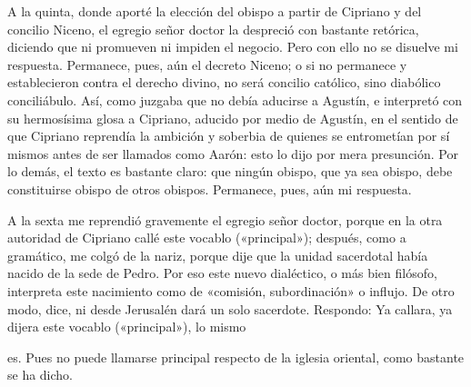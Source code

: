 A la quinta, donde aporté la elección del obispo a partir de Cipriano y del concilio Niceno, el egregio señor doctor la despreció con bastante retórica, diciendo que ni promueven ni impiden el negocio. Pero con ello no se disuelve mi respuesta. Permanece, pues, aún el decreto Niceno; o si no permanece y establecieron contra el derecho divino, no será concilio católico, sino diabólico conciliábulo. Así, como juzgaba que no debía aducirse a Agustín, e interpretó con su hermosísima glosa a Cipriano, aducido por medio de Agustín, en el sentido de que Cipriano reprendía la ambición y soberbia de quienes se entrometían por sí mismos antes de ser llamados como Aarón: esto lo dijo por mera presunción. Por lo demás, el texto es bastante claro: que ningún obispo, que ya sea obispo, debe constituirse obispo de otros obispos. Permanece, pues, aún mi respuesta.

A la sexta me reprendió gravemente el egregio señor doctor, porque en la otra autoridad de Cipriano callé este vocablo («principal»); después, como a gramático, me colgó de la nariz, porque dije que la unidad sacerdotal había nacido de la sede de Pedro. Por eso este nuevo dialéctico, o más bien filósofo, interpreta este nacimiento como de «comisión, subordinación» o influjo. De otro modo, dice, ni desde Jerusalén dará un solo sacerdote. Respondo: Ya callara, ya dijera este vocablo («principal»), lo mismo

es. Pues no puede llamarse principal respecto de la iglesia oriental, como bastante se ha dicho.

